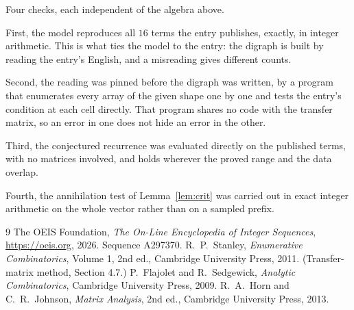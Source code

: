\documentclass[11pt,a4paper]{article}
\theoremstyle{plain}
\theoremstyle{definition}
\begin{document}
Four checks, each independent of the algebra above.

First, the model reproduces all $16$ terms the entry publishes, exactly, in integer
arithmetic. This is what ties the model to the entry: the digraph is built by reading the
entry's English, and a misreading gives different counts.

Second, the reading was pinned before the digraph was written, by a program that enumerates
every array of the given shape one by one and tests the entry's condition at each cell
directly. That program shares no code with the transfer matrix, so an error in one does not
hide an error in the other.

Third, the conjectured recurrence was evaluated directly on the published terms, with no
matrices involved, and holds wherever the proved range and the data overlap.

Fourth, the annihilation test of Lemma~\ref{lem:crit} was carried out in exact integer
arithmetic on the whole vector rather than on a sampled prefix.

\begin{thebibliography}{9}
 The OEIS Foundation, \emph{The On-Line Encyclopedia of Integer
Sequences}, \url{https://oeis.org}, 2026. Sequence A297370.
 R.~P.~Stanley, \emph{Enumerative Combinatorics}, Volume 1, 2nd ed.,
Cambridge University Press, 2011. (Transfer-matrix method, Section 4.7.)
 P.~Flajolet and R.~Sedgewick, \emph{Analytic Combinatorics}, Cambridge
University Press, 2009.
 R.~A.~Horn and C.~R.~Johnson, \emph{Matrix Analysis}, 2nd ed., Cambridge
University Press, 2013.
\end{thebibliography}
\end{document}
